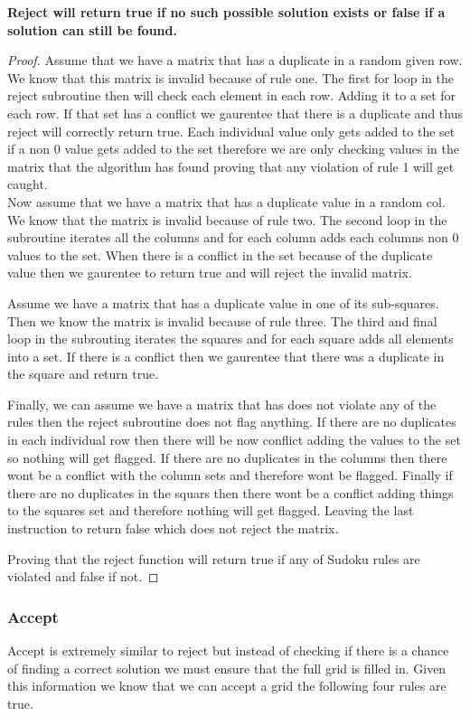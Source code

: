 \documentclass{sig-alternate}
\begin{document}
\textbf{Reject will return true if no such possible solution exists or false if a solution can still be found. }
\begin{proof}

Assume that we have a matrix that has a duplicate in a random given row. We know that this matrix is invalid because of rule one. The first for loop in the reject subroutine then will check each element in each row. Adding it to a set for each row. If that set has a conflict we gaurentee that there is a duplicate and thus reject will correctly return true. Each individual value only gets added to the set if a non 0 value gets added to the set therefore we are only checking values in the matrix that the algorithm has found proving that any violation of rule 1 will get caught. \\

Now assume that we have a matrix that has a duplicate value in a random col.
We know that the matrix is invalid because of rule two. The second loop in the subroutine iterates all the columns and for each column adds each columns non 0 values to the set. When there is a conflict in the set because of the duplicate value then we gaurentee to return true and will reject the invalid matrix. 

Assume we have a matrix that has a duplicate value in one of its sub-squares. Then we know the matrix is invalid because of rule three. The third and final loop in the subrouting iterates the squares and for each square adds all elements into a set. If there is a conflict then we gaurentee that there was a duplicate in the square and return true. 

Finally, we can assume we have a matrix that has does not violate any of the rules then the reject subroutine does not flag anything. If there are no duplicates in each individual row then there will be now conflict adding the values to the set so nothing will get flagged. If there are no duplicates in the columns then there wont be a conflict with the column sets and therefore wont be flagged. Finally if there are no duplicates in the squars then there wont be a conflict adding things to the squares set and therefore nothing will get flagged. Leaving the last instruction to return false which does not reject the matrix. 

Proving that the reject function will return true if any of Sudoku rules are violated and false if not. 
\end{proof}

\subsubsection{Accept}
Accept is extremely similar to reject but instead of checking if there is a chance of finding a correct solution we must ensure that the full grid is filled in. Given this information we know that we can accept a grid the following four rules are true. 
\end{document}
